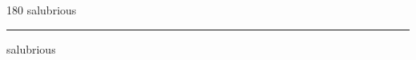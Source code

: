 
\begin{frame}
\begin{center}
\begin{turn}{180}
{\fontsize{2.5cm}{1em}\selectfont salubrious}
\end{turn}
\vspace{1em}\par  
\hrule
\vspace{1em}\par  
{\fontsize{2.5cm}{1em}\selectfont salubrious}
\end{center}
\end{frame}
